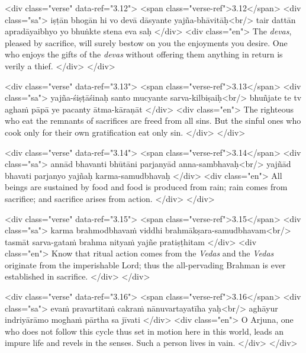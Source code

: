 \begin{html}
<div class="verse" data-ref="3.12">
  <span class="verse-ref">3.12</span>
  <div class="sa">
    iṣṭān bhogān hi vo devā dāsyante yajña-bhāvitāḥ<br/>
    tair dattān apradāyaibhyo yo bhuṅkte stena eva saḥ
  </div>
  <div class="en">
    The \textit{devas}, pleased by sacrifice, will surely bestow on you the enjoyments you desire. One who enjoys the gifts of the \textit{devas} without offering them anything in return is verily a thief.
  </div>
</div>
\end{html}



\begin{html}
<div class="verse" data-ref="3.13">
  <span class="verse-ref">3.13</span>
  <div class="sa">
    yajña-śiṣṭāśinaḥ santo mucyante sarva-kilbiṣaiḥ<br/>
    bhuñjate te tv aghaṁ pāpā ye pacanty ātma-kāraṇāt
  </div>
  <div class="en">
    The righteous who eat the remnants of sacrifices are freed from all sins. But the sinful ones who cook only for their own gratification eat only sin.
  </div>
</div>
\end{html}



\begin{html}
<div class="verse" data-ref="3.14">
  <span class="verse-ref">3.14</span>
  <div class="sa">
    annād bhavanti bhūtāni parjanyād anna-sambhavaḥ<br/>
    yajñād bhavati parjanyo yajñaḥ karma-samudbhavaḥ
  </div>
  <div class="en">
    All beings are sustained by food and food is produced from rain; rain comes from sacrifice; and sacrifice arises from action.
  </div>
</div>
\end{html}



\begin{html}
<div class="verse" data-ref="3.15">
  <span class="verse-ref">3.15</span>
  <div class="sa">
    karma brahmodbhavaṁ viddhi brahmākṣara-samudbhavam<br/>
    tasmāt sarva-gataṁ brahma nityaṁ yajñe pratiṣṭhitam
  </div>
  <div class="en">
    Know that ritual action comes from the \textit{Vedas} and the \textit{Vedas} originate from the imperishable Lord; thus the all-pervading Brahman is ever established in sacrifice.
  </div>
</div>
\end{html}



\begin{html}
<div class="verse" data-ref="3.16">
  <span class="verse-ref">3.16</span>
  <div class="sa">
    evaṁ pravartitaṁ cakraṁ nānuvartayatīha yaḥ<br/>
    aghāyur indriyārāmo moghaṁ pārtha sa jīvati
  </div>
  <div class="en">
    O Arjuna, one who does not follow this cycle thus set in motion here in this world, leads an impure life and revels in the senses. Such a person lives in vain.
  </div>
</div>
\end{html}


